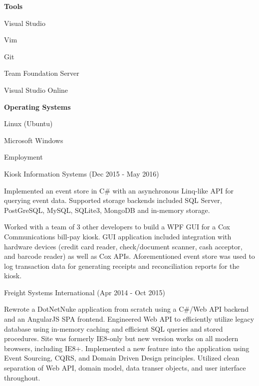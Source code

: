 \documentclass{article}
\begin{document}
\begin{multicols}{2}
        \textbf{Tools}

            \smallskip

            Visual Studio

            Vim

            Git

            Team Foundation Server

            Visual Studio Online


        \bigskip

        \textbf{Operating Systems}

            \smallskip

            Linux (Ubuntu)

            Microsoft Windows 

    \end{multicols}


    
    \bigskip\bigskip\bigskip

    {
        \noindent\Large
        Employment
    }

    \noindent\makebox[\linewidth]{\rule{\textwidth}{0.4pt}}
    \medskip

    {
        \large
        Kiosk Information Systems
        {
            \color{fade-gray}
            \small
            (Dec 2015 - May 2016)
        }
    }

    \medskip

    Implemented an event store in C\# with an asynchronous Linq-like API for querying event data. Supported storage backends included SQL Server, PostGreSQL, MySQL, SQLite3, MongoDB and in-memory storage.

    \smallskip

    Worked with a team of 3 other developers to build a WPF GUI for a Cox Communications bill-pay kiosk. GUI application included integration with hardware devices (credit card reader, check/document scanner, cash acceptor, and barcode reader) as well as Cox APIs. Aforementioned event store was used to log transaction data for generating receipts and reconciliation reports for the kiosk.


    \bigskip\bigskip

    {
        \large
        Freight Systems International
        {
            \color{fade-gray}
            \small
            (Apr 2014 - Oct 2015)
        }
    }

    \medskip

    Rewrote a DotNetNuke application from scratch using a C\#/Web API backend and an AngularJS SPA frontend. Engineered Web API to efficiently utilize legacy database using in-memory caching and efficient SQL queries and stored procedures. Site was formerly IE8-only but new version works on all modern browsers, including IE8+. Implemented a new feature into the application using Event Sourcing, CQRS, and Domain Driven Design principles. Utilized clean separation of Web API, domain model, data transer objects, and user interface throughout.
\end{document}
